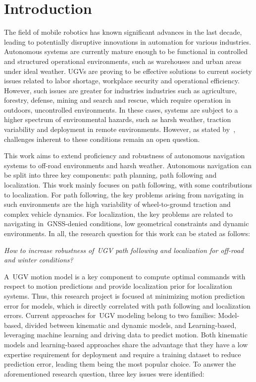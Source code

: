 \section{Introduction}
\label{sec:introduction}

The field of mobile robotics has known significant advances in the last decade, leading to potentially disruptive innovations in automation for various industries.
Autonomous systems are currently mature enough to be functional in controlled and structured operational environments, such as warehouses and urban areas under ideal weather.
\acp{UGV} are proving to be effective solutions to current society issues related to labor shortage, workplace security and operational efficiency. 
However, such issues are greater for industries industries such as agriculture, forestry, defense, mining and search and rescue,  which require operation in outdoors, uncontrolled environments.
In these cases, systems are subject to a higher spectrum of environmental hazards, such as harsh weather, traction variability and deployment in remote environments.
However, as stated by~\citet{VanBrummelen2018}, challenges inherent to these conditions remain an open question.

This work aims to extend proficiency and robustness of autonomous navigation systems to off-road environments and harsh weather. 
Autonomous navigation can be split into three key components: path planning, path following and localization. 
This work mainly focuses on path following, with some contributions to localization.
For path following, the key problems arising from navigating in such environments are the high variability of wheel-to-ground traction and complex vehicle dynamics.
For localization, the key problems are related to navigating in~\ac{GNSS}-denied conditions, low geometrical constraints and dynamic environments.
In all, the research question for this work can be stated as follows:

\begin{center}
	\emph{
		How to increase robustness of~\ac{UGV} path following and localization for off-road and winter conditions?
	}
\end{center}

A~\ac{UGV} motion model is a key component to compute optimal commands with respect to motion predictions and provide localization prior for localization systems. %
Thus, this research project is focused at minimizing motion prediction error for models, which is directly correlated with path following and localization errors. 
Current approaches for~\ac{UGV} modeling belong to two families: Model-based, divided between kinematic and dynamic models, and Learning-based, leveraging machine learning and driving data to predict motion.
Both kinematic models and learning-based approaches share the advantage that they have a low expertise requirement for deployment and require a training dataset to reduce prediction error, leading them being the most popular choice.
To answer the aforementioned research question, three key issues were identified:

